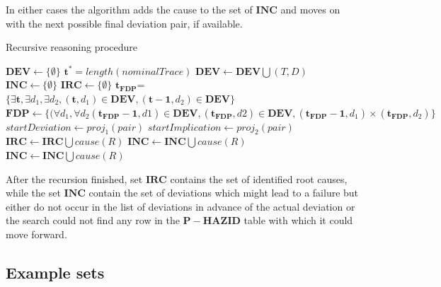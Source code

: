 \documentclass[conference]{IEEEtran}
\begin{document}
In either cases the algorithm adds the cause to the set of $\mathbf{INC}$ and moves on with the next possible final deviation pair, if available.

\begin{algorithm*}
\caption{Recursive reasoning procedure}
\label{alg:main}
\begin{algorithmic}[1]
\State $\mathbf{DEV} \leftarrow \{ \emptyset \}$
\State $\mathbf{t^*}=length(nominalTrace)$
\State $\mathbf{DEV} \leftarrow \mathbf{DEV} \bigcup (T,D)$
\EndFor
\EndFor
\State $\mathbf{INC} \leftarrow \{ \emptyset \}$
\State $\mathbf{IRC} \leftarrow \{ \emptyset \}$
\State $\mathbf{t_{FDP}}$=$\{ \exists \mathbf{t}, \exists d_1, \exists d_2, (\mathbf{t},d_1) \in \mathbf{DEV}, (\mathbf{t-1},d_2) \in \mathbf{DEV} \}$
\State $\mathbf{FDP} \leftarrow \{(\forall d_1,\forall d_2 (\mathbf{t_{FDP}-1},d1) \in \mathbf{DEV},(\mathbf{t_{FDP}},d2) \in \mathbf{DEV}, (\mathbf{t_{FDP}-1},d_1) \times (\mathbf{t_{FDP}},d_2) \}$ 
  \State $startDeviation \leftarrow proj_1(pair)$
  \State $startImplication \leftarrow proj_2(pair)$
  \State {}
\EndFor
{}
     \State $\mathbf{IRC} \leftarrow \mathbf{IRC} \bigcup cause(R)$
     \State \Return
   \Else
          	\State {}
     \Else
      \State $\mathbf{INC} \leftarrow \mathbf{INC} \bigcup cause(R)$
      \State \Return
     \EndIf
   \EndIf
 \EndFor
\Else
\State $\mathbf{INC} \leftarrow \mathbf{INC} \bigcup cause(R)$
      \State \Return
\EndIf
\EndProcedure
\end{algorithmic}
\end{algorithm*}

After the recursion finished, set $\mathbf{IRC}$ contains the set of identified root causes, while the set
$\mathbf{INC}$ contain the set of deviations which might lead to a failure but either do not occur in the list
of deviations in advance of the actual deviation or the search could not find any row in the $\mathbf{P-HAZID}$ table with which it could move forward.

\subsection{Example sets}
\label{sec:exsets}
\end{document}
